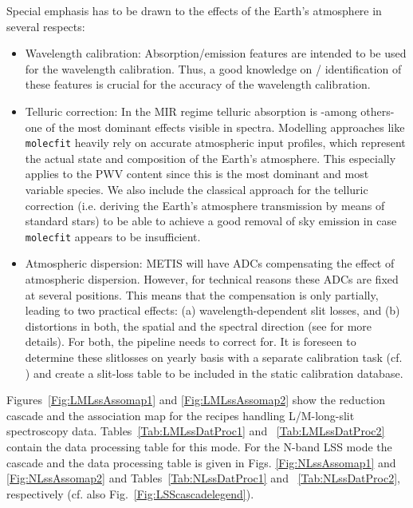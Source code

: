 Special emphasis has to be drawn to the effects of the Earth's atmosphere in several respects:
\begin{itemize}
\item Wavelength calibration: Absorption/emission features are intended to be
  used for the wavelength calibration. Thus, a good knowledge on /
  identification of these features is crucial for the accuracy of the
  wavelength calibration.
\item Telluric correction: In the MIR regime telluric absorption is -among others- one of the most dominant effects visible in    
 spectra. Modelling approaches like \texttt{molecfit} heavily rely on accurate atmospheric input profiles, which represent the actual state and composition of the Earth's atmosphere. This especially applies to the \ac{PWV} content since this is the most dominant and most variable species. We also include the classical approach for the telluric correction (i.e. deriving the Earth's atmosphere transmission by means of standard stars) to be able to achieve a good removal of sky emission in case \texttt{molecfit} appears to be insufficient.
\item Atmospheric dispersion: \ac{METIS} will have \ac{ADC}s compensating the effect of atmospheric dispersion. However, for technical reasons these ADCs are fixed at several positions. This means that the     compensation is only partially, leading to two practical effects:
  (a) wavelength-dependent slit losses, and (b) distortions in both,
  the spatial and the spectral direction (see \cite{METIS-ADC_study}
  for more details). For both, the pipeline needs to correct
  for. It is foreseen to determine these slitlosses on yearly basis with a separate calibration task (cf. \cite{METIS-calibration_plan}) and create a slit-loss table to be included in the static calibration database.
\end{itemize}


Figures~\ref{Fig:LMLssAssomap1} and \ref{Fig:LMLssAssomap2} show the reduction cascade and the association map for the recipes handling L/M-long-slit
spectroscopy data.  Tables~\ref{Tab:LMLssDatProc1} and ~\ref{Tab:LMLssDatProc2} contain the data processing table for this mode. For the N-band \ac{LSS} mode the cascade and the data processing table is given in Figs. \ref{Fig:NLssAssomap1} and \ref{Fig:NLssAssomap2} and Tables~\ref{Tab:NLssDatProc1} and ~\ref{Tab:NLssDatProc2}, respectively (cf. also Fig.~\ref{Fig:LSScascadelegend}).


